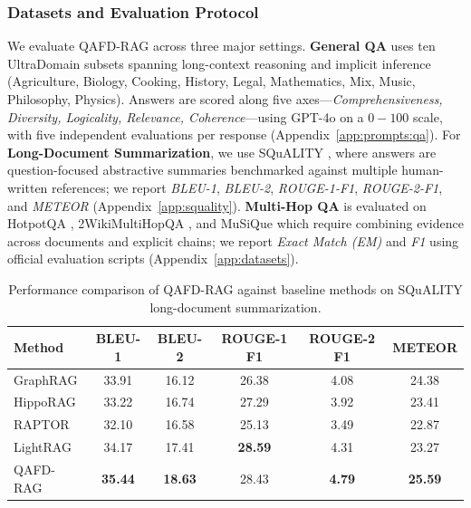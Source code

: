 \documentclass{article} %
\begin{document}
\subsubsection{Datasets and Evaluation Protocol}
We evaluate QAFD-RAG across three major settings. \textbf{General QA} uses ten {UltraDomain} subsets \citep{qian2024memorag} spanning long-context reasoning and implicit inference (Agriculture, Biology, Cooking, History, Legal, Mathematics, Mix, Music, Philosophy, Physics). Answers are scored along five axes—\emph{Comprehensiveness, Diversity, Logicality, Relevance, Coherence}—using GPT-4o on a \(0\!-\!100\) scale, with five independent evaluations per response (Appendix~\ref{app:prompts:qa}). {For \textbf{Long-Document Summarization}, we use {SQuALITY} \citep{wang2022squality}, where answers are question-focused abstractive summaries benchmarked against multiple human-written references; we report \emph{BLEU-1}, \emph{BLEU-2}, \emph{ROUGE-1-F1}, \emph{ROUGE-2-F1}, and \emph{METEOR} (Appendix~\ref{app:squality}).} \textbf{Multi-Hop QA} is evaluated on {HotpotQA} \citep{yang2018hotpotqa}, {2WikiMultiHopQA} \citep{ho2020constructing}, and {{MuSiQue} \citep{trivedi2022musique}} which require combining evidence across documents and explicit chains; we report \emph{Exact Match (EM)} and \emph{F1} using official evaluation scripts (Appendix~\ref{app:datasets}).





\begin{table}[t]
\centering
\caption{Performance comparison of QAFD-RAG against baseline methods on SQuALITY long-document summarization.}
\label{tab:squality_automated}
\begin{tabular}{lccccc}
\hline
\textbf{{Method}} &
\textbf{{BLEU-1}} &
\textbf{{BLEU-2}} &
\textbf{{ROUGE-1 F1}} &
\textbf{{ROUGE-2 F1}} &
\textbf{{METEOR}} \\
\hline

{GraphRAG}   
  & {33.91} 
  & {16.12} 
  & {26.38}
  & {4.08} 
  & {24.38} \\

{HippoRAG}   
  & {33.22} 
  & {16.74} 
  & {27.29}
  & {3.92} 
  & {23.41} \\

{RAPTOR}     
  & {32.10} 
  & {16.58} 
  & {25.13} 
  & {3.49} 
  & {22.87} \\

{LightRAG}   
  & {34.17} 
  & {17.41} 
  & \textbf{{28.59}}
  & {4.31} 
  & {23.27} \\

{QAFD-RAG}
  & \textbf{{35.44}} 
  & \textbf{{18.63}} 
  & {28.43} 
  & \textbf{{4.79}} 
  & \textbf{{25.59}} \\
\hline
\end{tabular}
\vspace{-0.25cm}
\end{table}
\end{document}
